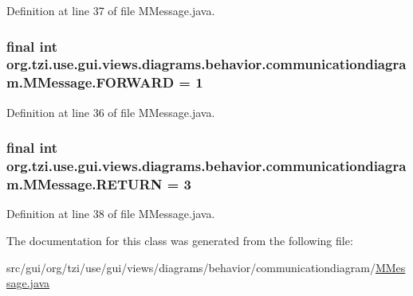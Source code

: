 Definition at line 37 of file M\-Message.\-java.

\hypertarget{classorg_1_1tzi_1_1use_1_1gui_1_1views_1_1diagrams_1_1behavior_1_1communicationdiagram_1_1_m_message_a663d85e45f5ec35f893f0207321cd190}{
\subsubsection[{F\-O\-R\-W\-A\-R\-D}]{\setlength{\rightskip}{0pt plus 5cm}final int org.\-tzi.\-use.\-gui.\-views.\-diagrams.\-behavior.\-communicationdiagram.\-M\-Message.\-F\-O\-R\-W\-A\-R\-D = 1\hspace{0.3cm}{\ttfamily [static]}}}\label{classorg_1_1tzi_1_1use_1_1gui_1_1views_1_1diagrams_1_1behavior_1_1communicationdiagram_1_1_m_message_a663d85e45f5ec35f893f0207321cd190}


Definition at line 36 of file M\-Message.\-java.

\hypertarget{classorg_1_1tzi_1_1use_1_1gui_1_1views_1_1diagrams_1_1behavior_1_1communicationdiagram_1_1_m_message_a9822f19f12f199b169ad365bf0473e8f}{
\subsubsection[{R\-E\-T\-U\-R\-N}]{\setlength{\rightskip}{0pt plus 5cm}final int org.\-tzi.\-use.\-gui.\-views.\-diagrams.\-behavior.\-communicationdiagram.\-M\-Message.\-R\-E\-T\-U\-R\-N = 3\hspace{0.3cm}{\ttfamily [static]}}}\label{classorg_1_1tzi_1_1use_1_1gui_1_1views_1_1diagrams_1_1behavior_1_1communicationdiagram_1_1_m_message_a9822f19f12f199b169ad365bf0473e8f}


Definition at line 38 of file M\-Message.\-java.



The documentation for this class was generated from the following file\-:\begin{DoxyCompactItemize}
\item 
src/gui/org/tzi/use/gui/views/diagrams/behavior/communicationdiagram/\hyperlink{_m_message_8java}{M\-Message.\-java}\end{DoxyCompactItemize}
